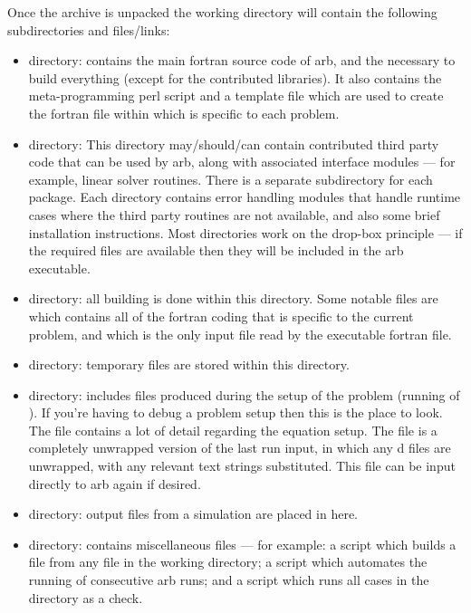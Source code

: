 Once the archive is unpacked the working directory will contain the following subdirectories and files/links:
%
\begin{itemize}
\item {} directory: contains the main fortran source code of arb, and the  necessary to build everything (except for the contributed libraries).  It also contains the meta-programming perl script  and a template file  which are used to create the fortran file  within  which is specific to each problem.
\item {} directory:  This directory may/should/can contain contributed third party code that can be used by arb, along with associated interface modules --- for example, linear solver routines.  There is a separate subdirectory for each package.  Each directory contains error handling modules that handle runtime cases where the third party routines are not available, and also some brief installation instructions.  Most directories work on the drop-box principle --- if the required files are available then they will be included in the arb executable.
\item {} directory: all building is done within this directory.  Some notable files are  which contains all of the fortran coding that is specific to the current problem, and  which is the only input file read by the executable fortran file.
\item {} directory: temporary files are stored within this directory.
\item {} directory: includes files produced during the setup of the problem (running of ).  If you're having to debug a problem setup then this is the place to look.  The file  contains a lot of detail regarding the equation setup.  The file  is a completely unwrapped version of the last run input, in which any d files are unwrapped, with any relevant text strings substituted.  This file can be input directly to arb again if desired.
\item {} directory: output files from a simulation are placed in here.
\item {} directory: contains miscellaneous files --- for example: a  script which builds a  file from any  file in the working directory; a  script which automates the running of consecutive arb runs; and a  script which runs all cases in the  directory as a check.

\end{itemize}
